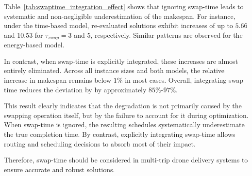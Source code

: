 \documentclass[3p, authoryear, 11pt]{elsarticle}
\begin{document}
Table~\ref{tab:swaptime_integration_effect} shows that ignoring swap-time leads to systematic and non-negligible underestimation of the makespan. For instance, under the time-based model, re-evaluated solutions exhibit increases of up to $5.66$ and $10.53$ for $\tau_{swap}=3$ and $5$, respectively. Similar patterns are observed for the energy-based model. 

In contrast, when swap-time is explicitly integrated, these increases are almost entirely eliminated. Across all instance sizes and both models, the relative increase in makespan remains below $1\%$ in most cases. Overall, integrating swap-time reduces the deviation by by approximately $85\%$-$97\%$.

This result clearly indicates that the degradation is not primarily caused by the swapping operation itself, but by the failure to account for it during optimization. When swap-time is ignored, the resulting schedules systematically underestimate the true completion time. By contrast, explicitly integrating swap-time allows routing and scheduling decisions to absorb most of their impact.

Therefore, swap-time should be considered in multi-trip drone delivery systems to ensure accurate and robust solutions.




\end{document}
